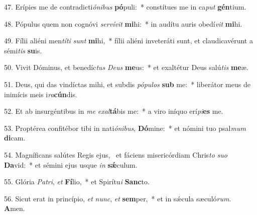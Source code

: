 47. Erípies me de contradicti\textit{ó}\textit{ni}\textit{bus} \textbf{pó}puli:~*  constítues me in ca\textit{put} \textbf{gén}tium.\

48. Pópulus quem non cognóvi \textit{ser}\textit{ví}\textit{vit} \textbf{mi}hi:~*  in audítu auris obedí\textit{vit} \textbf{mi}hi.\

49. Fílii aliéni men\textit{tí}\textit{ti} \textit{sunt} \textbf{mi}hi,~*  fílii aliéni inveteráti sunt, et claudicavérunt a sémi\textit{tis} \textbf{su}is.\

50. Vivit Dóminus, et benedíc\textit{tus} \textit{De}\textit{us} \textbf{me}us:~*  et exaltétur Deus salú\textit{tis} \textbf{me}æ.\

51. Deus, qui das vindíctas mihi, et subdis \textit{pó}\textit{pu}\textit{los} \textbf{sub} me:~*  liberátor meus de inimícis meis i\textit{ra}\textbf{cún}dis.\

52. Et ab insurgéntibus in \textit{me} \textit{ex}\textit{al}\textbf{tá}bis me:~*  a viro iníquo erí\textit{pi}\textbf{es} me.\

53. Proptérea confitébor tibi in nati\textit{ó}\textit{ni}\textit{bus}, \textbf{Dó}mine:~*  et nómini tuo psal\textit{mum} \textbf{di}cam.\

54. Magníficans salútes Regis ejus, \dag\  et fáciens misericórdiam Chris\textit{to} \textit{su}\textit{o} \textbf{Da}vid:~*  et sémini ejus usque \textit{in} \textbf{sǽ}culum.\

55. Glória \textit{Pa}\textit{tri}, \textit{et} \textbf{Fí}lio,~*  et Spirítu\textit{i} \textbf{Sanc}to.\

56. Sicut erat in princípio, \textit{et} \textit{nunc}, \textit{et} \textbf{sem}per,~*  et in sǽcula sæculó\textit{rum}. \textbf{A}men.\

